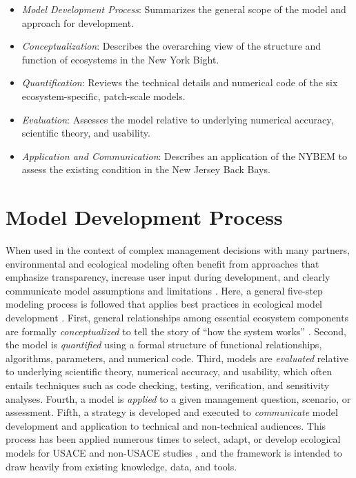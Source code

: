 \documentclass[
]{book}
\begin{document}
\begin{itemize}
\item
  \emph{Model Development Process}: Summarizes the general scope of the model and approach for development.
\item
  \emph{Conceptualization}: Describes the overarching view of the structure and function of ecosystems in the New York Bight.
\item
  \emph{Quantification}: Reviews the technical details and numerical code of the six ecosystem-specific, patch-scale models.
\item
  \emph{Evaluation}: Assesses the model relative to underlying numerical accuracy, scientific theory, and usability.
\item
  \emph{Application and Communication}: Describes an application of the NYBEM to assess the existing condition in the New Jersey Back Bays.
\end{itemize}

\hypertarget{model-development-process}{%
\chapter{Model Development Process}\label{model-development-process}}

When used in the context of complex management decisions with many partners, environmental and ecological modeling often benefit from approaches that emphasize transparency, increase user input during development, and clearly communicate model assumptions and limitations \citep{van_den_belt_mediated_2004, voinov_modelling_2010, herman_unpacking_2019}. Here, a general five-step modeling process is followed that applies best practices in ecological model development \citep{grant_ecological_2008}. First, general relationships among essential ecosystem components are formally \emph{conceptualized} to tell the story of ``how the system works'' \citep{fischenich_application_2008}. Second, the model is \emph{quantified} using a formal structure of functional relationships, algorithms, parameters, and numerical code. Third, models are \emph{evaluated} relative to underlying scientific theory, numerical accuracy, and usability, which often entails techniques such as code checking, testing, verification, and sensitivity analyses. Fourth, a model is \emph{applied} to a given management question, scenario, or assessment. Fifth, a strategy is developed and executed to \emph{communicate} model development and application to technical and non-technical audiences. This process has been applied numerous times to select, adapt, or develop ecological models for USACE and non-USACE studies \citep[e.g.,][]{mckay_aligning_2019, herman_unpacking_2019}, and the framework is intended to draw heavily from existing knowledge, data, and tools.
\end{document}

